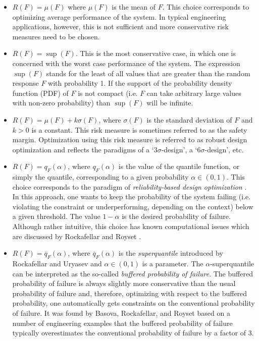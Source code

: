 \documentclass{llncs}
\begin{document}
\begin{itemize}
  \item $R(F)=\mu(F)$ where $\mu(F)$ is the mean of $F$. This choice corresponds to optimizing average performance of the system. In typical engineering applications, however, this is not sufficient and more conservative risk measures need to be chosen.
  \item $R(F)=\sup(F)$. This is the most conservative case, in which one is concerned with the worst case performance of the system. The expression $\sup(F)$ stands for the least of all values that are greater than the random response $F$ with probability 1. If the support of the probability density function (PDF) of $F$ is not compact (i.e. $F$ can take arbitrary large values with non-zero probability) than $\sup(F)$ will be infinite.
  \item $R(F)=\mu(F)+k\sigma(F)$, where $\sigma(F)$ is the standard deviation of $F$ and $k>0$ is a constant. This risk measure is sometimes referred to as the safety margin. Optimization using this risk measure is referred to as robust design optimization \cite{KochYangGu2004,Yao2011,ZhangZhuChenArendt2013} and reflects the paradigms of a ‘$3\sigma$-design’, a ‘$6\sigma$-design’, etc.
  \item $R(F)=q_F(\alpha)$, where $q_F(\alpha)$ is the value of the quantile function, or simply the quantile, corresponding to a given probability $\alpha\in (0,1)$. This choice corresponds to the paradigm of \textit{reliability-based design optimization} \cite{AouesChateauneuf2010,Yao2011,YounChoi2004}. In this approach, one wants to keep the probability of the system failing (i.e. violating the constraint or underperforming, depending on the context) below a given threshold. The value $1-\alpha$ is the desired probability of failure. Although rather intuitive, this choice has known computational issues which are discussed by Rockafellar and Royset \cite{RockafellarRoyset2010}.
  \item $R(F)=\overline{q}_F(\alpha)$, where $\overline{q}_F(\alpha)$ is the \textit{superquantile} introduced by Rockafellar and Uryasev \cite{RockafellarUryasev2000} and $\alpha \in (0,1)$ is a parameter. The $\alpha$-superquantile can be interpreted as the so-called \textit{buffered probability of failure}. The buffered probability of failure is always slightly more conservative than the usual probability of failure and, therefore, optimizing with respect to the buffered probability, one automatically gets constraints on the conventional probability of failure. It was found by Basova, Rockafellar, and Royset \cite{BasovaRockafellarRoyset} based on a number of engineering examples that the buffered probability of failure typically overestimates the conventional probability of failure by a factor of 3. 	
\end{itemize}
\end{document}
